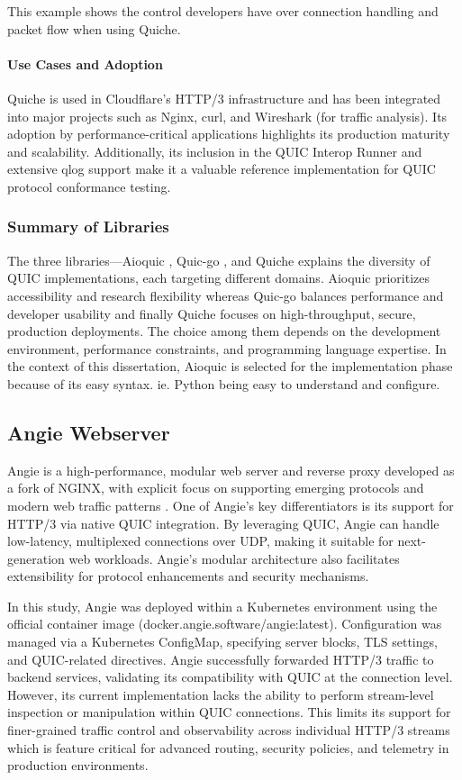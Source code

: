 This example shows the control developers have over connection handling and packet flow when using Quiche.

\paragraph{Use Cases and Adoption}
Quiche is used in Cloudflare's HTTP/3 infrastructure and has been integrated into major projects such as Nginx, curl, and Wireshark (for traffic analysis). Its adoption by performance-critical applications highlights its production maturity and scalability. Additionally, its inclusion in the QUIC Interop Runner and extensive qlog support make it a valuable reference implementation for QUIC protocol conformance testing.

\subsubsection{Summary of Libraries}
The three libraries—Aioquic \cite{aioquic-repo}, Quic-go \cite{quic-go-repo}, and Quiche \cite{quiche-repo} explains the diversity of QUIC implementations, each targeting different domains. Aioquic prioritizes accessibility and research flexibility whereas Quic-go balances performance and developer usability and finally Quiche focuses on high-throughput, secure, production deployments. The choice among them depends on the development environment, performance constraints, and programming language expertise. In the context of this dissertation, Aioquic is selected for the implementation phase because of its easy syntax.  ie. Python being easy to understand and configure.

\subsection{Angie Webserver}
Angie is a high-performance, modular web server and reverse proxy developed as a fork of NGINX, with explicit focus on supporting emerging protocols and modern web traffic patterns \cite{angie-docs}. One of Angie's key differentiators is its support for HTTP/3 via native QUIC integration. By leveraging QUIC, Angie can handle low-latency, multiplexed connections over UDP, making it suitable for next-generation web workloads. Angie's modular architecture also facilitates extensibility for protocol enhancements and security mechanisms.

In this study, Angie was deployed within a Kubernetes environment using the official container image (docker.angie.software/angie:latest). Configuration was managed via a Kubernetes ConfigMap, specifying server blocks, TLS settings, and QUIC-related directives. Angie successfully forwarded HTTP/3 traffic to backend services, validating its compatibility with QUIC at the connection level. However, its current implementation lacks the ability to perform stream-level inspection or manipulation within QUIC connections. This limits its support for finer-grained traffic control and observability across individual HTTP/3 streams which is feature critical for advanced routing, security policies, and telemetry in production environments.

